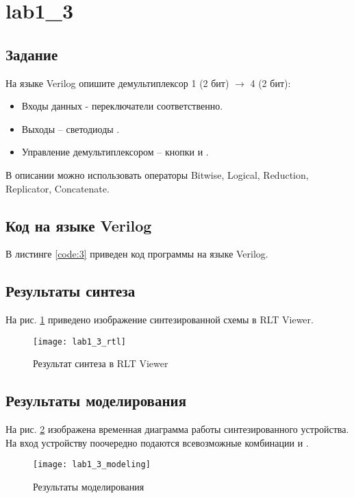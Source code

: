 \newpage

\section{lab1\_3}

\subsection{Задание}

На языке Verilog опишите демультиплексор 1 (2 бит) $\rightarrow$ 4 (2 бит):
\begin{itemize}
	\item Входы данных - переключатели  соответственно.
	\item Выходы – светодиоды .
	\item Управление демультиплексором – кнопки  и .
\end{itemize}

В описании можно использовать операторы Bitwise, Logical, Reduction, Replicator, Concatenate.

\subsection{Код на языке Verilog}

В листинге \ref{code:3} приведен код программы на языке Verilog.



\subsection{Результаты синтеза}

На рис. \ref{fig:lab1_3_rtl} приведено изображение синтезированной схемы в RLT Viewer.

\begin{figure}[H]
\begin{center}
	\texttt{[image: lab1\_3\_rtl]}
	\caption{Результат синтеза в RLT Viewer}
	\label{fig:lab1_3_rtl}
\end{center}
\end{figure}

\subsection{Результаты моделирования}
\label{sec:lab1_3_modeling}

На рис. \ref{fig:lab1_3_modeling} изображена временная диаграмма работы синтезированного устройства. На вход устройству поочередно подаются всевозможные комбинации  и .
\begin{figure}[H]
\begin{center}
	\texttt{[image: lab1\_3\_modeling]}
	\caption{Результаты моделирования}
	\label{fig:lab1_3_modeling}
\end{center}
\end{figure}

